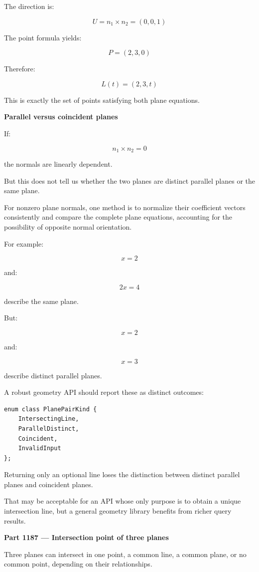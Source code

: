 The direction is:

\[
U=n_1\times n_2=(0,0,1)
\]

The point formula yields:

\[
P=(2,3,0)
\]

Therefore:

\[
\boxed{ L(t)=(2,3,t) }
\]

This is exactly the set of points satisfying both plane equations.

\textbf{Parallel versus coincident planes}

If:

\[
n_1\times n_2=0
\]

the normals are linearly dependent.

But this does not tell us whether the two planes are distinct parallel planes or the same plane.

For nonzero plane normals, one method is to normalize their coefficient vectors consistently and compare the complete plane equations, accounting for the possibility of opposite normal orientation.

For example:

\[
x=2
\]

and:

\[
2x=4
\]

describe the same plane.

But:

\[
x=2
\]

and:

\[
x=3
\]

describe distinct parallel planes.

A robust geometry API should report these as distinct outcomes:

\begin{verbatim}
enum class PlanePairKind {
    IntersectingLine,
    ParallelDistinct,
    Coincident,
    InvalidInput
};
\end{verbatim}

Returning only an optional line loses the distinction between distinct parallel planes and coincident planes.

That may be acceptable for an API whose only purpose is to obtain a unique intersection line, but a general geometry library benefits from richer query results.

\textbf{Part 1187 --- Intersection point of three planes}

Three planes can intersect in one point, a common line, a common plane, or no common point, depending on their relationships.

